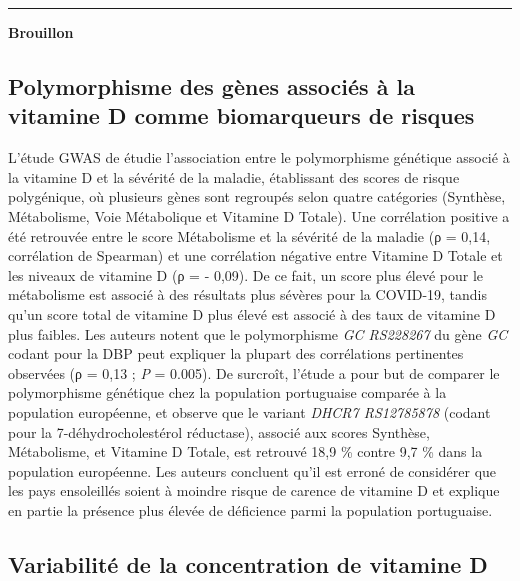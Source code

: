 \documentclass[
  a4paper,
  DIV=11,
  numbers=noendperiod,
  listof=totoc]{scrreprt}
\begin{document}
\begin{center}\rule{0.5\linewidth}{0.5pt}\end{center}

\textbf{Brouillon}

\subsection{Polymorphisme des gènes associés à la vitamine D comme
biomarqueurs de
risques}\label{polymorphisme-des-guxe8nes-associuxe9s-uxe0-la-vitamine-d-comme-biomarqueurs-de-risques}

L'étude \ac{GWAS} de \textcite{Freitas.2021} étudie l'association entre
le polymorphisme génétique associé à la vitamine D et la sévérité de la
maladie, établissant des scores de risque polygénique, où plusieurs
gènes sont regroupés selon quatre catégories (Synthèse, Métabolisme,
Voie Métabolique et Vitamine D Totale). Une corrélation positive a été
retrouvée entre le score Métabolisme et la sévérité de la maladie (ρ =
0,14, corrélation de Spearman) et une corrélation négative entre
Vitamine D Totale et les niveaux de vitamine D (ρ = - 0,09). De ce fait,
un score plus élevé pour le métabolisme est associé à des résultats plus
sévères pour la COVID-19, tandis qu'un score total de vitamine D plus
élevé est associé à des taux de vitamine D plus faibles. Les auteurs
notent que le polymorphisme \emph{GC RS228267} du gène \emph{GC} codant
pour la \ac{DBP} peut expliquer la plupart des corrélations pertinentes
observées (ρ = 0,13 ; \emph{P} = 0.005). De surcroît, l'étude a pour but
de comparer le polymorphisme génétique chez la population portuguaise
comparée à la population européenne, et observe que le variant
\emph{DHCR7 RS12785878} (codant pour la 7-déhydrocholestérol réductase),
associé aux scores Synthèse, Métabolisme, et Vitamine D Totale, est
retrouvé 18,9 \% contre 9,7 \% dans la population européenne. Les
auteurs concluent qu'il est erroné de considérer que les pays
ensoleillés soient à moindre risque de carence de vitamine D et explique
en partie la présence plus élevée de déficience parmi la population
portuguaise.

\subsection{Variabilité de la concentration de vitamine
D}\label{variabilituxe9-de-la-concentration-de-vitamine-d}
\end{document}

